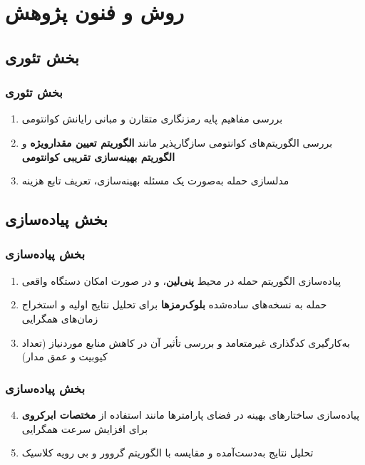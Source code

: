\documentclass[xcolor=dvipsnames, professionalfonts, aspectratio=169, 11pt]{beamer}
\begin{document}
\section{روش و فنون پژوهش}
\subsection{بخش تئوری}
\begin{frame}
    \frametitle{بخش تئوری}
    \begin{enumerate}
        \item بررسی مفاهیم پایه رمزنگاری متقارن و مبانی رایانش کوانتومی
        \cite{nielsen2010quantum,hoffstein2014introduction}
        \item بررسی الگوریتم‌های کوانتومی سازگارپذیر مانند \textbf{الگوریتم تعیین مقدارویژه} و \textbf{الگوریتم بهینه‌سازی تقریبی کوانتومی}
        \cite{cerezo2021variational}
        \item مدلسازی حمله به‌صورت یک مسئله بهینه‌سازی، تعریف تابع هزینه
    \end{enumerate}
\end{frame}
\subsection{بخش پیاده‌سازی}
\begin{frame}
    \frametitle{بخش پیاده‌سازی}
    \begin{enumerate}
        \item پیاده‌سازی الگوریتم حمله در محیط \textbf{پنی‌لین}، و در صورت امکان دستگاه واقعی
        \item حمله به نسخه‌های ساده‌شده \textbf{بلوک‌رمزها} برای تحلیل نتایج اولیه و استخراج زمان‌های همگرایی
        \cite{hoffstein2014introduction}
        \item به‌کارگیری کدگذاری غیرمتعامد و بررسی تأثیر آن در کاهش منابع موردنیاز (تعداد کیوبیت و عمق مدار)
    \end{enumerate}
\end{frame}

\begin{frame}
    \frametitle{بخش پیاده‌سازی}
    \begin{enumerate}
        \setcounter{enumi}{3}
        \item پیاده‌سازی ساختارهای بهینه در فضای پارامترها مانند استفاده از \textbf{مختصات ابرکروی} برای افزایش سرعت همگرایی
        \cite{bermejo2024improving}
        \item تحلیل نتایج به‌دست‌آمده و مقایسه با الگوریتم گروور و بی رویه کلاسیک
    \end{enumerate}
\end{frame}
\end{document}
